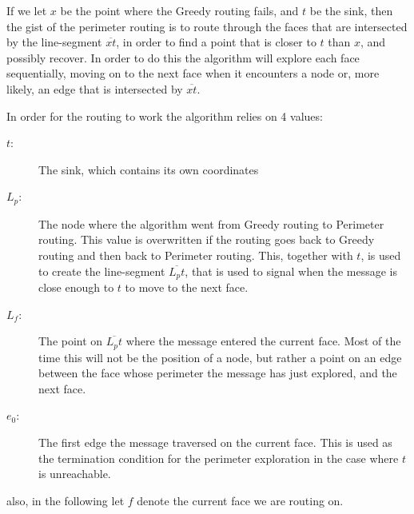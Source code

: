 If we let $x$ be the point where the Greedy routing fails, and $t$ be the sink, then the gist of the perimeter routing is to route through the faces that are intersected by the line-segment $\overline{xt}$, in order to find a point that is closer to $t$ than $x$, and possibly recover. In order to do this the algorithm will explore each face sequentially, moving on to the next face when it encounters a node or, more likely, an edge that is intersected by $\overline{xt}$. 

In order for the routing to work the algorithm relies on 4 values:
\begin{description}
\item[$t$:] The sink, which contains its own coordinates
\item[$L_p$:] The node where the algorithm went from Greedy routing to Perimeter routing. This value is overwritten if the routing goes back to Greedy routing and then back to Perimeter routing. This, together with $t$, is used to create the line-segment $\overline{L_pt}$, that is used to signal when the message is close enough to $t$ to move to the next face.
\item[$L_f$:] The point on $\overline{L_pt}$ where the message entered the current face. Most of the time this will not be the position of a node, but rather a point on an edge between the face whose perimeter the message has just explored, and the next face. 
\item[$e_0$:] The first edge the message traversed on the current face. This is used as the termination condition for the perimeter exploration in the case where $t$ is unreachable. 
\end{description}

also, in the following let $f$ denote the current face we are routing on.

